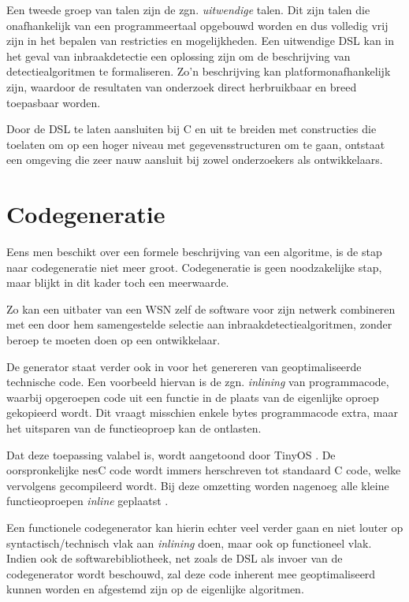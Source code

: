 Een tweede groep van talen zijn de zgn. \emph{uitwendige} talen. Dit zijn talen
die onafhankelijk van een programmeertaal opgebouwd worden en dus volledig vrij
zijn in het bepalen van restricties en mogelijkheden. Een uitwendige DSL kan in
het geval van inbraakdetectie een oplossing zijn om de beschrijving van
detectiealgoritmen te formaliseren. Zo'n beschrijving kan platformonafhankelijk
zijn, waardoor de resultaten van onderzoek direct herbruikbaar en breed
toepasbaar worden.

Door de DSL te laten aansluiten bij C en uit te breiden met constructies die
toelaten om op een hoger niveau met gegevensstructuren om te gaan, ontstaat een
omgeving die zeer nauw aansluit bij zowel onderzoekers als ontwikkelaars.

\vspace{-3mm}

\section{Codegeneratie}
\label{section:solution-codegen}

Eens men beschikt over een formele beschrijving van een algoritme, is de stap
naar codegeneratie niet meer groot. Codegeneratie is geen noodzakelijke stap,
maar blijkt in dit kader toch een meerwaarde.

Zo kan een uitbater van een WSN zelf de software voor zijn netwerk combineren
met een door hem samengestelde selectie aan inbraakdetectiealgoritmen, zonder
beroep te moeten doen op een ontwikkelaar.

De generator staat verder ook in voor het genereren van geoptimaliseerde
technische code. Een voorbeeld hiervan is de zgn. \emph{inlining} van
programmacode, waarbij opgeroepen code uit een functie in de plaats van de
eigenlijke oproep gekopieerd wordt. Dit vraagt misschien enkele bytes
programmacode extra, maar het uitsparen van de functieoproep kan de \mcu
ontlasten.

Dat deze toepassing valabel is, wordt aangetoond door TinyOS
\citep{levis2005tinyos}. De oorspronkelijke nesC code wordt immers herschreven
tot standaard C code, welke vervolgens gecompileerd wordt. Bij deze omzetting
worden nagenoeg alle kleine functieoproepen \emph{inline} geplaatst
\citep{gay2007software}.

Een functionele codegenerator kan hierin echter veel verder gaan en niet louter
op syntactisch/technisch vlak aan \emph{inlining} doen, maar ook op functioneel
vlak. Indien ook de softwarebibliotheek, net zoals de DSL als invoer van de
codegenerator wordt beschouwd, zal deze code inherent mee geoptimaliseerd
kunnen worden en afgestemd zijn op de eigenlijke algoritmen.


